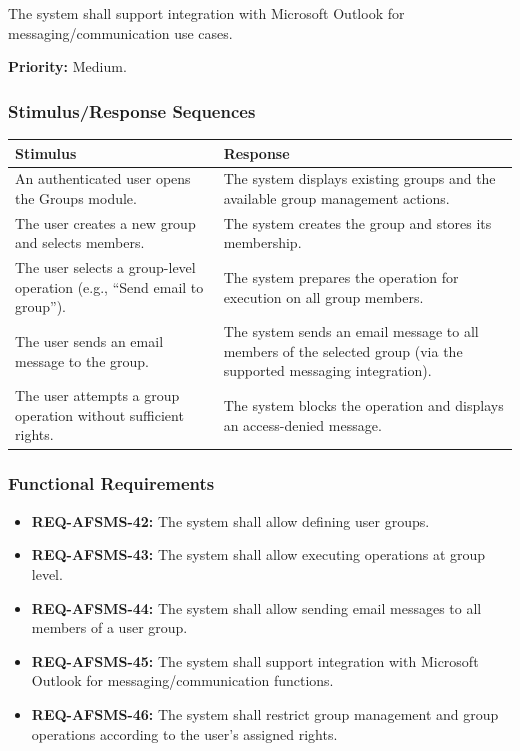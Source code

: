 \documentclass[11pt, a4paper]{article}
\begin{document}
The system shall support integration with Microsoft Outlook for messaging/communication use cases.

\textbf{Priority:} Medium.

\subsubsection{Stimulus/Response Sequences}
\begin{table}[H]
\begin{tabularx}{\textwidth}{>{\raggedright\arraybackslash}p{6cm} >{\raggedright\arraybackslash}X}
\toprule
\textbf{Stimulus} & \textbf{Response} \\
\midrule
An authenticated user opens the Groups module. & The system displays existing groups and the available group management actions. \\
\midrule
The user creates a new group and selects members. & The system creates the group and stores its membership. \\
\midrule
The user selects a group-level operation (e.g., ``Send email to group''). & The system prepares the operation for execution on all group members. \\
\midrule
The user sends an email message to the group. & The system sends an email message to all members of the selected group (via the supported messaging integration). \\
\midrule
The user attempts a group operation without sufficient rights. & The system blocks the operation and displays an access-denied message. \\
\bottomrule
\end{tabularx}
\end{table}

\subsubsection{Functional Requirements}
\begin{itemize}
    \item \textbf{REQ-AFSMS-42:} The system shall allow defining user groups.
    \item \textbf{REQ-AFSMS-43:} The system shall allow executing operations at group level.
    \item \textbf{REQ-AFSMS-44:} The system shall allow sending email messages to all members of a user group.
    \item \textbf{REQ-AFSMS-45:} The system shall support integration with Microsoft Outlook for messaging/communication functions.
    \item \textbf{REQ-AFSMS-46:} The system shall restrict group management and group operations according to the user's assigned rights.
\end{itemize}
\end{document}
